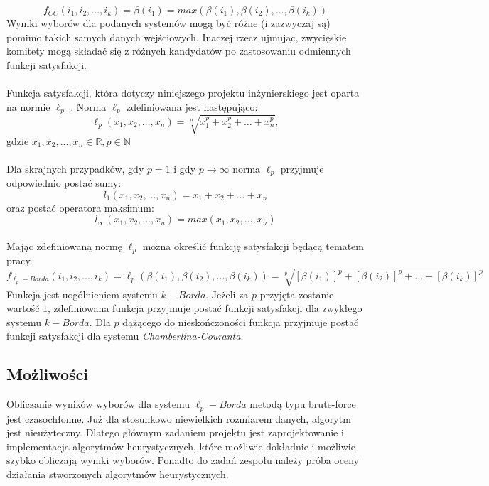\documentclass[polish,11pt]{aghthesis}
\begin{document}
\begin{equation}
\label{eq:cc}
f_{CC}(i_1, i_2, ..., i_k) = \beta(i_1) = max(\beta(i_1), \beta(i_2), ..., \beta(i_k))
\end{equation}
Wyniki wyborów dla podanych systemów mogą być różne (i zazwyczaj są) pomimo takich
samych danych wejściowych. Inaczej rzecz ujmując, zwycięskie komitety mogą składać się z
różnych kandydatów po zastosowaniu odmiennych funkcji satysfakcji. \\ \\
Funkcja satysfakcji, która dotyczy niniejszego projektu inżynierskiego jest oparta na normie
$\ell_p$ . Norma $\ell_p$ zdefiniowana jest następująco:
\begin{equation}
\ell_p(x_1,x_2,\dots, x_n) = \sqrt[p]{x_1^p+x_2^p+\dots+x_n^p},
\end{equation}
gdzie $x_1, x_2, ..., x_n \in \mathbb{R}, p \in \mathbb{N}$ \\ \\
Dla skrajnych przypadków, gdy $p = 1$ i gdy $p \to \infty$ norma $\ell_p$ przyjmuje odpowiednio postać sumy: 
\begin{equation}
l_1(x_1, x_2,\dots, x_n) = x_1 + x_2 +\dots+ x_n
\end{equation}
oraz postać operatora maksimum: 
\begin{equation}
l_\infty(x_1, x_2,\dots, x_n) = max(x_1, x_2,\dots, x_n)
\end{equation}
\\ Mając zdefiniowaną normę $\ell_p$ można określić funkcję satysfakcji będącą tematem pracy. 
\begin{equation}
f_{{\ell_p}-Borda}(i_1, i_2, ..., i_k) = \ell_p(\beta(i_1), \beta(i_2), ..., \beta(i_k)) = \sqrt[p]{[\beta(i_1)]^p+[\beta(i_2)]^p+\dots+[\beta(i_k)]^p}
\end{equation}
\clearpage
Funkcja jest uogólnieniem systemu $k-Borda$. Jeżeli za $p$ przyjęta zostanie wartość $1$,
zdefiniowana funkcja przyjmuje postać funkcji satysfakcji dla zwykłego systemu $k-Borda$. Dla $p$ dążącego do nieskończoności funkcja przyjmuje postać funkcji satysfakcji dla systemu
\textit{Chamberlina-Couranta}.


\subsection{Możliwości}
Obliczanie wyników wyborów dla systemu $\ell_p-Borda$ metodą typu brute-force jest
czasochłonne. Już dla stosunkowo niewielkich rozmiarem danych, algorytm jest nieużyteczny. Dlatego głównym zadaniem projektu jest zaprojektowanie i implementacja algorytmów heurystycznych, które możliwie dokładnie i możliwie szybko obliczają wyniki wyborów. Ponadto do zadań zespołu należy próba oceny działania stworzonych algorytmów heurystycznych.
\end{document}
